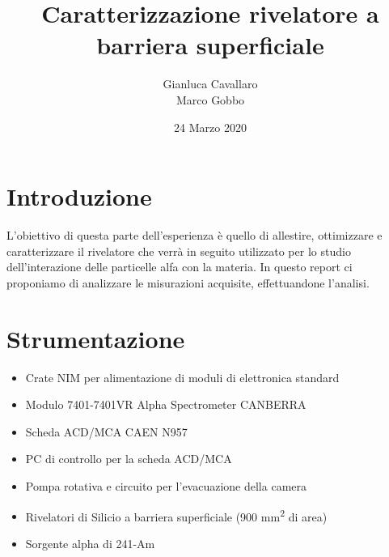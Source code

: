 \documentclass[a4paper,10pt]{article}
\title{Caratterizzazione rivelatore a barriera superficiale}
\author{Gianluca Cavallaro \\ Marco Gobbo}
\date{24 Marzo 2020}
\begin{document}
\maketitle


\section{Introduzione}
    L'obiettivo di questa parte dell'esperienza \`e quello di allestire, ottimizzare e caratterizzare il rivelatore che verr\`a in seguito utilizzato per lo studio dell'interazione delle particelle alfa con la materia. In questo report ci proponiamo di analizzare le misurazioni acquisite, effettuandone l'analisi.


\section{Strumentazione}
\begin{itemize}
    \item Crate NIM per alimentazione di moduli di elettronica standard
    \item Modulo 7401-7401VR Alpha Spectrometer CANBERRA
    \item Scheda ACD/MCA CAEN N957
    \item PC di controllo per la scheda ACD/MCA
    \item Pompa rotativa e circuito per l'evacuazione della camera
    \item Rivelatori di Silicio a barriera superficiale (900 mm\textsuperscript{2} di area)
    \item Sorgente alpha di 241-Am
\end{itemize}

\end{document}
